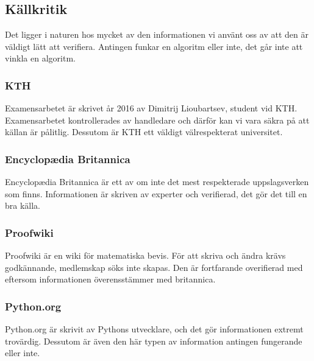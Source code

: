 \documentclass[12pt,a4paper]{article}
\begin{document}
\subsection{Källkritik}
Det ligger i naturen hos mycket av den informationen vi använt oss av att den är väldigt lätt att verifiera. Antingen funkar en algoritm eller inte, det går inte att vinkla en algoritm. 
\subsubsection{KTH}
Examensarbetet är skrivet år 2016 av Dimitrij Lioubartsev, student vid KTH. Examensarbetet kontrollerades av handledare och därför kan vi vara säkra på att källan är pålitlig. Dessutom är KTH ett väldigt välrespekterat universitet.
\subsubsection{Encyclopædia Britannica}
Encyclopædia Britannica är ett av om inte det mest respekterade uppslagsverken som finns. Informationen är skriven av experter och verifierad, det gör det till en bra källa. 
\subsubsection{Proofwiki}
Proofwiki är en wiki för matematiska bevis. För att skriva och ändra krävs godkännande, medlemskap söks inte skapas. Den är fortfarande overifierad med eftersom informationen överensstämmer med britannica.
\subsubsection{Python.org}
Python.org är skrivit av Pythons utvecklare, och det gör informationen extremt trovärdig. Dessutom är även den här typen av information antingen fungerande eller inte. 
\end{document}
